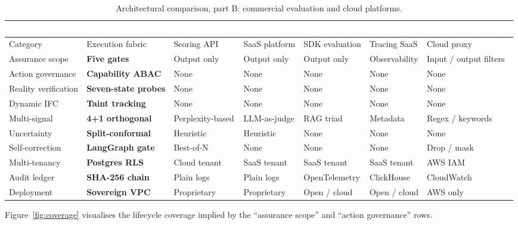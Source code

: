 \documentclass[11pt,a4paper]{article}
\newcommand{\hc}[1]{\textcolor{white}{\textbf{#1}}}
\newcommand{\hdrrow}{\rowcolor{primarynavy}}
\begin{document}
\begin{table}[!htbp]
\centering\scriptsize
\renewcommand{\arraystretch}{1.25}
\begin{tabularx}{\linewidth}{@{}L{2.1cm} Y Y Y Y Y Y@{}}
\hdrrow \hc{Dimension} & \hc{MIRAGE 3.0} & \hc{Cleanlab TLM} & \hc{Galileo} & \hc{TruLens} & \hc{Langfuse} & \hc{Bedrock Guardrails}\\
\toprule
Category & Execution fabric & Scoring API & SaaS platform & SDK evaluation & Tracing SaaS & Cloud proxy\\
Assurance scope & \textbf{Five gates} & Output only & Output only & Output only & Observability & Input / output filters\\
Action governance & \textbf{Capability ABAC} & None & None & None & None & None\\
Reality verification & \textbf{Seven-state probes} & None & None & None & None & None\\
Dynamic IFC & \textbf{Taint tracking} & None & None & None & None & None\\
Multi-signal & \textbf{4+1 orthogonal} & Perplexity-based & LLM-as-judge & RAG triad & Metadata & Regex / keywords\\
Uncertainty & \textbf{Split-conformal} & Heuristic & Heuristic & None & None & None\\
Self-correction & \textbf{LangGraph gate} & Best-of-N & None & None & None & Drop / mask\\
Multi-tenancy & \textbf{Postgres RLS} & Cloud tenant & SaaS tenant & SaaS tenant & SaaS tenant & AWS IAM\\
Audit ledger & \textbf{SHA-256 chain} & Plain logs & Plain logs & OpenTelemetry & ClickHouse & CloudWatch\\
Deployment & \textbf{Sovereign VPC} & Proprietary & Proprietary & Open / cloud & Open / cloud & AWS only\\
\bottomrule
\end{tabularx}
\caption{Architectural comparison, part B: commercial evaluation and cloud platforms.}
\label{tab:competitors_b}
\end{table}

Figure~\ref{fig:coverage} visualises the lifecycle coverage implied by the ``assurance scope'' and ``action governance'' rows.
\end{document}
